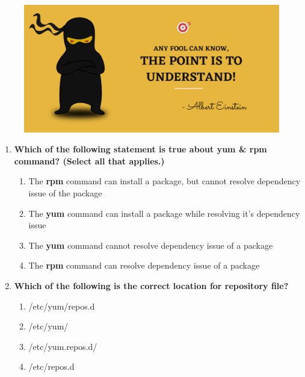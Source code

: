\setlength{\columnsep}{3pt}
\begin{flushleft}
	
	\paragraph{}
	\bigskip
	
	\begin{figure}[h!]
		\centering
		\includegraphics[scale=.2]{content/practise.jpg}
	\end{figure}	
	\begin{enumerate}
		
		\item \textbf{Which of the following statement is true about yum \& rpm command? (Select all that applies.)}
		\begin{enumerate}[label=(\alph*)]
			\item The \textbf{rpm} command can install a package, but cannot resolve dependency issue of the package %
			\item The \textbf{yum} command can install a package while resolving it's dependency issue %
			\item The \textbf{yum} command cannot resolve dependency issue of a package
			\item The \textbf{rpm} command can resolve dependency issue of a package
		\end{enumerate}
		\bigskip
		\bigskip
		
		\item \textbf{Which of the following is the correct location for repository file?}
		\begin{enumerate}[label=(\alph*)]
			\item /etc/yum/repos.d
			\item /etc/yum/
			\item /etc/yum.repos.d/  %
			\item /etc/repos.d
		\end{enumerate}
		\bigskip
		\bigskip	
		

\end{enumerate}
\end{flushleft}
